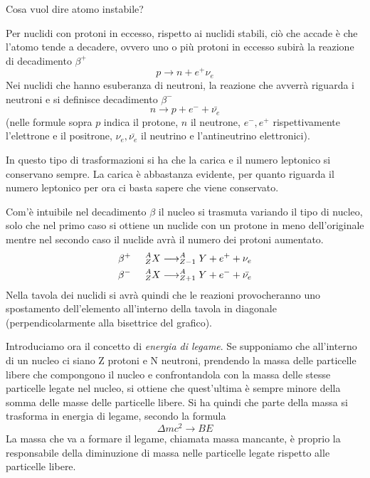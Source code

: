 Cosa vuol dire atomo instabile?

Per nuclidi con protoni in eccesso, rispetto ai nuclidi stabili, ciò che accade è che l'atomo tende a decadere, ovvero uno o più protoni in eccesso subirà la reazione di decadimento $\beta^+$
\begin{equation}
p\longrightarrow n+e^+\nu_e
\end{equation}
Nei nuclidi che hanno esuberanza di neutroni, la reazione che avverrà riguarda i neutroni e si definisce decadimento $\beta^-$
\begin{equation}
n\longrightarrow p+e^- +\bar{\nu_e}
\end{equation}
(nelle formule sopra $p$ indica il protone, $n$ il neutrone, $e^-, e^+$ rispettivamente l'elettrone e il positrone, $\nu_e, \bar{\nu_e} $ il neutrino e l'antineutrino elettronici).

In questo tipo di trasformazioni si ha che la carica e il numero leptonico si conservano sempre. 
La carica è abbastanza evidente, per quanto riguarda il numero leptonico per ora ci basta sapere che viene conservato.

Com'è intuibile nel decadimento $\beta$ il nucleo si trasmuta variando il tipo di nucleo, solo che nel primo caso si ottiene un nuclide con un protone in meno dell'originale mentre nel secondo caso il nuclide avrà il numero dei protoni aumentato.
\begin{equation}
\begin{split}
\beta^+\hspace{0.5cm}^A_ZX \longrightarrow ^A_{Z-1}Y+e^+ +\nu_e\\
\beta^-\hspace{0.5cm} ^A_ZX \longrightarrow ^A_{Z+1}Y+e^- +\bar{\nu_e}
\end{split}
\end{equation}
Nella tavola dei nuclidi si avrà quindi che le reazioni provocheranno uno spostamento dell'elemento all'interno della tavola in diagonale (perpendicolarmente alla bisettrice del grafico).

Introduciamo ora il concetto di \emph{energia di legame}. 
Se supponiamo che all'interno di un nucleo ci siano Z protoni e N neutroni, prendendo la massa delle particelle libere che compongono il nucleo e confrontandola con la massa delle stesse particelle legate nel nucleo, si ottiene che quest'ultima è sempre minore della somma delle masse delle particelle libere.
Si ha quindi che parte della massa si trasforma in energia di legame, secondo la formula 
\begin{equation}
\Delta m c^2 \to BE
\end{equation}
La massa che va a formare il legame, chiamata massa mancante, è proprio la responsabile della diminuzione di massa nelle particelle legate rispetto alle particelle libere.

